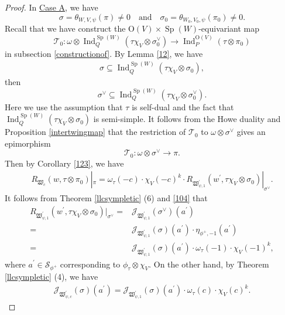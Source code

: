 \documentclass[article]{article}
\numberwithin{equation}{section}
\theoremstyle{definition}
\DeclareMathOperator{\Ind}{Ind}
\DeclareMathOperator{\SP}{Sp}
\begin{document}
\begin{proof}
In \underline{Case A}, we have 
$$\sigma=\theta_{W,V,\psi}(\pi)\neq 0\quad \mbox{and} \quad \sigma_0=\theta_{W_0,V_0,\psi}(\pi_0)\neq 0.$$ 
Recall that we have construct the $\mathrm O(V)\times \SP(W)$-equivariant map 
$$\mathcal{T}_{0} : \omega\otimes \operatorname{Ind}_{Q}^{\SP(W)}\left(\tau\chi_{V} \otimes \sigma_{0}^{\vee}\right) \rightarrow \operatorname{Ind}_{P}^{\mathrm{O}\left(V\right)}\left(\tau  \otimes \pi_0\right)$$
in subsection \ref{constructionof}. By Lemma \ref{12}, we have 
\begin{align*}
\sigma \subseteq \Ind_{Q}^{\SP(W)}(\tau\chi_{V}\otimes \sigma_{0}),
\end{align*}
 then 
$$\sigma^{\vee}\subseteq \Ind_{Q}^{\SP(W)}(\tau\chi_{V}\otimes \sigma_{0}^{\vee}).$$
Here we use the assumption that $\tau$ is self-dual and the fact that $\Ind_{Q}^{\SP(W)}(\tau\chi_{V}\otimes \sigma_{0})$ is semi-simple. It follows from the Howe duality and Proposition \ref{intertwingmap} that the restriction of $\mathcal T_0$ to $\omega\otimes \sigma^{\vee}$ gives an epimorphism 
	$$
	\mathcal T_0 :\omega\otimes \sigma^{\vee} \rightarrow \pi. 
	$$ 
Then by Corollary \ref{123}, we have 
	\begin{align}\label{81}
	R_{\mathfrak W_{c}}(w,\tau\otimes \pi_0)|_\pi=\omega_{\tau}(-c)\cdot \chi_{V}(-c)^k\cdot  R_{\mathfrak W^\prime_{\psi,1}}(w^{\prime},\tau\chi_{V}\otimes \sigma_0) |_{\sigma^{\vee}}. 
	\end{align}
 It follows from Theorem \ref{llcsympletic} (6) and \ref{104} that 
 \begin{equation}\label{82}
 \begin{aligned}
 	R_{\mathfrak W^\prime_{\psi,1}}(w^{\prime},\tau\chi_{V}\otimes \sigma_0) |_{\sigma^{\vee}}=&\mathcal J_{\mathfrak W^\prime_{\psi,1}}(\sigma^\vee)(a^\prime)\\
 	=&\mathcal J_{\mathfrak W^\prime_{\psi,1}}(\sigma)(a^\prime)\cdot \eta_{\phi^+,-1}(a^\prime)\\
 =&\mathcal J_{\mathfrak W^\prime_{\psi,1}}(\sigma)(a^\prime)\cdot \omega_{\tau}(-1)\cdot \chi_{V}(-1)^k,
 \end{aligned}
 \end{equation}
	where $a^{\prime}\in \mathcal S_{\phi^+}$ corresponding to $\phi_{\tau}\otimes \chi_{V}$. On the other hand, by Theorem \ref{llcsympletic} (4), we have 
	\begin{align}\label{84}
	\mathcal J_{\mathfrak W^\prime_{\psi,c}}(\sigma)(a^{\prime})=\mathcal J_{\mathfrak W^\prime_{\psi,1}}(\sigma)(a^{\prime})\cdot \omega_{\tau}(c)\cdot \chi_{V}(c)^{ k}. 

\end{align}
\end{proof}
\end{document}
